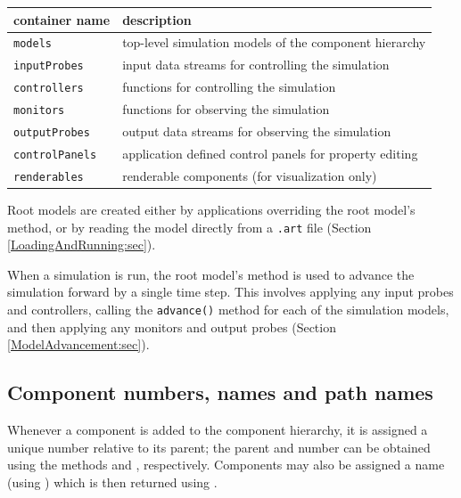 \begin{shadedregion}
\begin{tabular}{ll}
\hline
container name & description \\
\hline
\tt models & top-level simulation models of the component hierarchy \\
\tt inputProbes & input data streams for controlling the simulation \\
\tt controllers & functions for controlling the simulation \\
\tt monitors & functions for observing the simulation \\
\tt outputProbes & output data streams for observing the simulation \\
\tt controlPanels & application defined control panels for property editing \\
\tt renderables & renderable components (for visualization only) \\
\hline
\end{tabular}
\end{shadedregion}

Root models are created either by applications overriding the
root model's 
method, or by reading the model directly from a {\tt .art} file
(Section \ref{LoadingAndRunning:sec}).

When a simulation is run, the root model's
method is used to advance the simulation forward by a single time step. This
involves applying any input probes and controllers, calling the {\tt advance()}
method for each of the simulation models, and then applying any monitors
and output probes (Section \ref{ModelAdvancement:sec}).

\subsection{Component numbers, names and path names}
\label{PathNames:sec}

Whenever a component is added to the component hierarchy,
it is assigned a unique number relative to its
parent; the parent and number can be obtained using the methods
 and
,
respectively.  Components may also be assigned a name (using
)
which is then returned using
.

